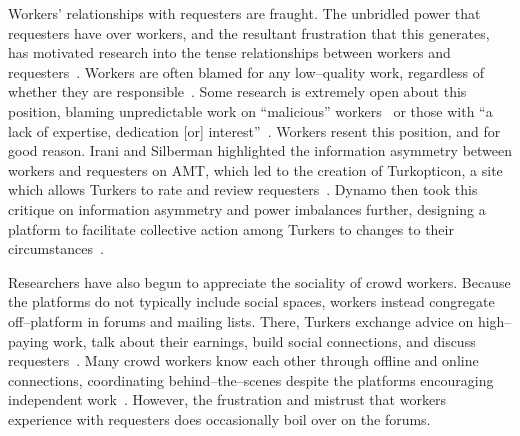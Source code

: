 \documentclass[pn4226]{subfiles}
\begin{document}
Workers' relationships with requesters are fraught.
The unbridled power that requesters have over workers, and
the resultant frustration that this generates,
has motivated research into
the tense relationships between workers and requesters~\cite{fixingChaos,dynamo}.
Workers are often blamed for any low--quality work, regardless of whether they are responsible~\cite{martin2014being,takingAHITMcInnis}.
Some research is extremely open about this position, blaming unpredictable work on ``malicious'' workers~\cite{MaliciousCrowdworkersGadiraju} or those with ``a lack of expertise, dedication [or] interest''~\cite{Sheng:2008:GLI:1401890.1401965}.
Workers resent this position, and for good reason.
Irani and Silberman highlighted the information asymmetry between workers and requesters on AMT,
which led to the creation of Turkopticon, a site which allows Turkers to rate and review requesters~\cite{turkopticon}.
Dynamo then took this critique on information asymmetry and power imbalances further, designing a platform to facilitate
collective action among Turkers to changes to their circumstances~\cite{dynamo}.


Researchers have also begun to appreciate the sociality of crowd workers.
Because the platforms do not typically include social spaces, workers instead congregate off--platform in forums and mailing lists.
There, Turkers exchange advice on high--paying work, talk about their earnings, build social connections, and discuss requesters~\cite{martin2014being}.
Many crowd workers know each other through offline and online connections, coordinating behind--the--scenes despite the platforms encouraging independent work~\cite{crowdcollab,yin2016communication}.
However, the frustration and mistrust that workers experience with requesters does occasionally boil over on the forums. 


\subsubsection{\pieceworkpers}

\begin{comment}
notes: what info do i assume the reader has seen already?
- Clark: pieceworkers work harder, more diligently, etc...
- Riis saw terrible conditions, documented and communicated it to the world
- Worker advocacy groups arose to speak out against piecework
\end{comment}
\end{document}

